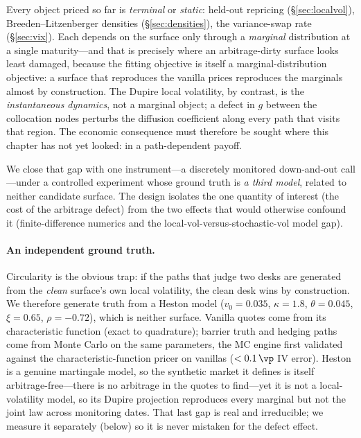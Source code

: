 Every object priced so far is \emph{terminal} or \emph{static}: held-out repricing
(\S\ref{sec:localvol}), Breeden--Litzenberger densities (\S\ref{sec:densities}), the
variance-swap rate (\S\ref{sec:vix}). Each depends on the surface only through a
\emph{marginal} distribution at a single maturity---and that is precisely where an
arbitrage-dirty surface looks least damaged, because the fitting objective is itself a
marginal-distribution objective: a surface that reproduces the vanilla prices reproduces the
marginals almost by construction. The Dupire local volatility, by contrast, is the
\emph{instantaneous dynamics}, not a marginal object; a defect in $g$ between the collocation
nodes perturbs the diffusion coefficient along every path that visits that region. The
economic consequence must therefore be sought where this chapter has not yet looked: in a
path-dependent payoff.

We close that gap with one instrument---a discretely monitored down-and-out call---under a
controlled experiment whose ground truth is \emph{a third model}, related to neither candidate
surface. The design isolates the one quantity of interest (the cost of the arbitrage defect)
from the two effects that would otherwise confound it (finite-difference numerics and the
local-vol-versus-stochastic-vol model gap).

\paragraph{An independent ground truth.} Circularity is the obvious trap: if the paths that
judge two desks are generated from the \emph{clean} surface's own local volatility, the clean
desk wins by construction. We therefore generate truth from a Heston model
($v_0{=}0.035$, $\kappa{=}1.8$, $\theta{=}0.045$, $\xi{=}0.65$, $\rho{=}-0.72$), which is
neither surface. Vanilla quotes come from its characteristic function (exact to quadrature);
barrier truth and hedging paths come from Monte Carlo on the same parameters, the MC engine
first validated against the characteristic-function pricer on vanillas
($<0.1\,\vp$ IV error). Heston is a genuine martingale model, so the synthetic market it
defines is itself arbitrage-free---there is no arbitrage in the quotes to find---yet it is not
a local-volatility model, so its Dupire projection reproduces every marginal but not the joint
law across monitoring dates. That last gap is real and irreducible; we measure it separately
(below) so it is never mistaken for the defect effect.

